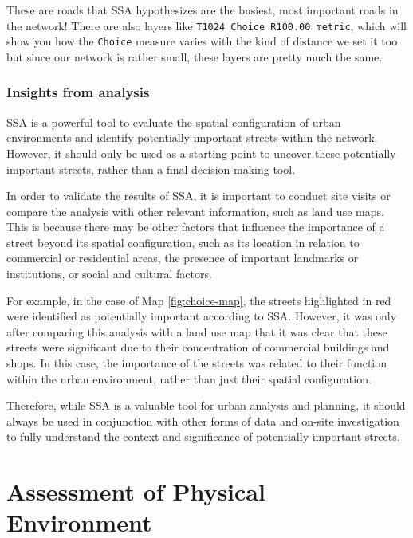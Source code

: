 \documentclass[
]{latex/krantz}
\begin{document}
These are roads that SSA hypothesizes are the busiest, most important roads in the network! There are also layers like \texttt{T1024\ Choice\ R100.00\ metric}, which will show you how the \texttt{Choice} measure varies with the kind of distance we set it too but since our network is rather small, these layers are pretty much the same.

\hypertarget{insights-from-analysis}{%
\subsubsection{Insights from analysis}\label{insights-from-analysis}}

SSA is a powerful tool to evaluate the spatial configuration of urban environments and identify potentially important streets within the network. However, it should only be used as a starting point to uncover these potentially important streets, rather than a final decision-making tool.

In order to validate the results of SSA, it is important to conduct site visits or compare the analysis with other relevant information, such as land use maps. This is because there may be other factors that influence the importance of a street beyond its spatial configuration, such as its location in relation to commercial or residential areas, the presence of important landmarks or institutions, or social and cultural factors.

For example, in the case of Map \ref{fig:choice-map}, the streets highlighted in red were identified as potentially important according to SSA. However, it was only after comparing this analysis with a land use map that it was clear that these streets were significant due to their concentration of commercial buildings and shops. In this case, the importance of the streets was related to their function within the urban environment, rather than just their spatial configuration.

Therefore, while SSA is a valuable tool for urban analysis and planning, it should always be used in conjunction with other forms of data and on-site investigation to fully understand the context and significance of potentially important streets.

\hypertarget{physical-environment}{%
\section{Assessment of Physical Environment}\label{physical-environment}}
\end{document}
